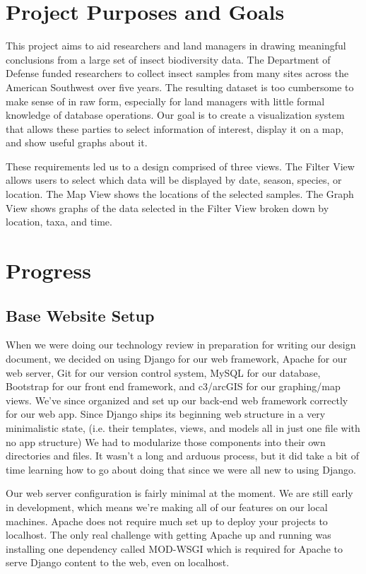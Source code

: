 \documentclass[10pt,peerreview,onecolumn,draftclsnofoot,technote]{IEEEtran}
\begin{document}
\section{Project Purposes and Goals} %
This project aims to aid researchers and land managers in drawing meaningful conclusions from a large set of insect biodiversity data.
The Department of Defense funded researchers to collect insect samples from many sites across the American Southwest over five years.
The resulting dataset is too cumbersome to make sense of in raw form, especially for land managers with little formal knowledge of database operations.
Our goal is to create a visualization system that allows these parties to select information of interest, display it on a map, and show useful graphs about it.

These requirements led us to a design comprised of three views.
The Filter View allows users to select which data will be displayed by date, season, species, or location.
The Map View shows the locations of the selected samples.
The Graph View shows graphs of the data selected in the Filter View broken down by location, taxa, and time.


\section{Progress}

\subsection{Base Website Setup} %
When we were doing our technology review in preparation for writing our design document, we decided on using Django for our web framework, Apache for our web server, Git for our version control system, MySQL for our database, Bootstrap for our front end framework, and c3/arcGIS for our graphing/map views.
We’ve since organized and set up our back-end web framework correctly for our web app.
Since Django ships its beginning web structure in a very minimalistic state, (i.e. their templates, views, and models all in just one file with no app structure) We had to modularize those components into their own directories and files.
It wasn’t a long and arduous process, but it did take a bit of time learning how to go about doing that since we were all new to using Django.

Our web server configuration is fairly minimal at the moment.
We are still early in development, which means we’re making all of our features on our local machines.
Apache does not require much set up to deploy your projects to localhost.
The only real challenge with getting Apache up and running was installing one dependency called MOD-WSGI which is required for Apache to serve Django content to the web, even on localhost.
\end{document}
